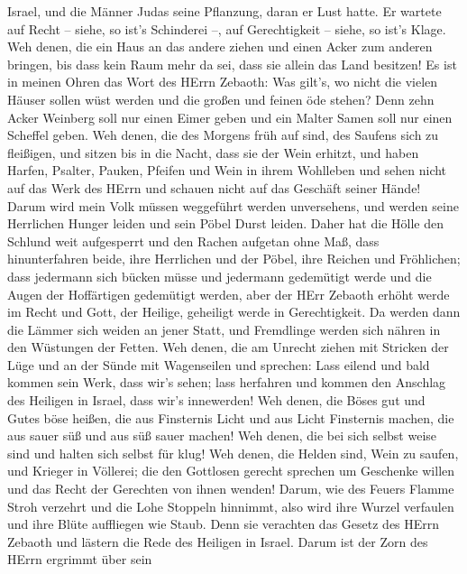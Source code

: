 Israel, und die Männer Judas seine Pflanzung, daran er Lust hatte. Er
wartete auf Recht -- siehe, so ist's Schinderei --, auf Gerechtigkeit --
siehe, so ist's Klage.  Weh denen, die ein Haus an das
andere ziehen und einen Acker zum anderen bringen, bis dass kein Raum
mehr da sei, dass sie allein das Land besitzen!  Es ist in
meinen Ohren das Wort des HErrn Zebaoth: Was gilt's, wo nicht die vielen
Häuser sollen wüst werden und die großen und feinen öde stehen?
 Denn zehn Acker Weinberg soll nur einen Eimer geben und
ein Malter Samen soll nur einen Scheffel geben.  Weh denen,
die des Morgens früh auf sind, des Saufens sich zu fleißigen, und sitzen
bis in die Nacht, dass sie der Wein erhitzt,  und haben
Harfen, Psalter, Pauken, Pfeifen und Wein in ihrem Wohlleben und sehen
nicht auf das Werk des HErrn und schauen nicht auf das Geschäft seiner
Hände!  Darum wird mein Volk müssen weggeführt werden
unversehens, und werden seine Herrlichen Hunger leiden und sein Pöbel
Durst leiden.  Daher hat die Hölle den Schlund weit
aufgesperrt und den Rachen aufgetan ohne Maß, dass hinunterfahren beide,
ihre Herrlichen und der Pöbel, ihre Reichen und Fröhlichen;
 dass jedermann sich bücken müsse und jedermann gedemütigt
werde und die Augen der Hoffärtigen gedemütigt werden, 
aber der HErr Zebaoth erhöht werde im Recht und Gott, der Heilige,
geheiligt werde in Gerechtigkeit.  Da werden dann die
Lämmer sich weiden an jener Statt, und Fremdlinge werden sich nähren in
den Wüstungen der Fetten.  Weh denen, die am Unrecht ziehen
mit Stricken der Lüge und an der Sünde mit Wagenseilen  und
sprechen: Lass eilend und bald kommen sein Werk, dass wir's sehen; lass
herfahren und kommen den Anschlag des Heiligen in Israel, dass wir's
innewerden!  Weh denen, die Böses gut und Gutes böse
heißen, die aus Finsternis Licht und aus Licht Finsternis machen, die
aus sauer süß und aus süß sauer machen!  Weh denen, die bei
sich selbst weise sind und halten sich selbst für klug! 
Weh denen, die Helden sind, Wein zu saufen, und Krieger in Völlerei;
 die den Gottlosen gerecht sprechen um Geschenke willen und
das Recht der Gerechten von ihnen wenden!  Darum, wie des
Feuers Flamme Stroh verzehrt und die Lohe Stoppeln hinnimmt, also wird
ihre Wurzel verfaulen und ihre Blüte auffliegen wie Staub. Denn sie
verachten das Gesetz des HErrn Zebaoth und lästern die Rede des Heiligen
in Israel.  Darum ist der Zorn des HErrn ergrimmt über sein

